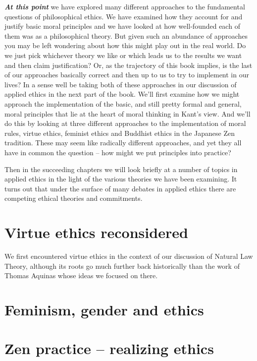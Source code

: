 \documentclass[12pt, openany]{book}
\begin{document}
\textbf{\emph{At this point}} we have explored many different approaches to the fundamental questions of philosophical ethics. We have examined how they account for and justify basic moral principles and we have looked at how well-founded each of them was as a philosophical theory. But given such an abundance of approaches you may be left wondering about how this might play out in the real world. Do we just pick whichever theory we like or which leads us to the results we want and then claim justification? Or, as the trajectory of this book implies, is the last of our approaches basically correct and then up to us to try to implement in our lives? In a sense well be taking both of these approaches in our discussion of applied ethics in the next part of the book. We'll first examine how we might approach the implementation of the basic, and still pretty formal and general, moral principles that lie at the heart of moral thinking in Kant's view. And we'll do this by looking at three different approaches to the implementation of moral rules, virtue ethics, feminist ethics and Buddhist ethics in the Japanese Zen tradition. These may seem like radically different approaches, and yet they all have in common the question -- how might we put principles into practice?

Then in the succeeding chapters we will look briefly at a number of topics in applied ethics in the light of the various theories we have been examining. It turns out that under the surface of many debates in applied ethics there are competing ethical theories and commitments.

\hypertarget{virtue-ethics-reconsidered}{%
\section{Virtue ethics reconsidered}\label{virtue-ethics-reconsidered}}

We first encountered virtue ethics in the context of our discussion of Natural Law Theory, although its roots go much further back historically than the work of Thomas Aquinas whose ideas we focused on there.

\hypertarget{feminism-gender-and-ethics}{%
\section{Feminism, gender and ethics}\label{feminism-gender-and-ethics}}

\hypertarget{zen-practice-realizing-ethics}{%
\section{Zen practice -- realizing ethics}\label{zen-practice-realizing-ethics}}
\end{document}
